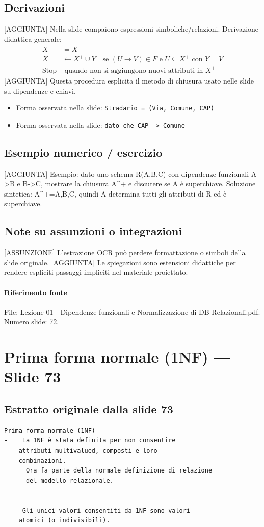 \documentclass[11pt]{article}
\begin{document}
\subsection*{Derivazioni}
[AGGIUNTA] Nella slide compaiono espressioni simboliche/relazioni. Derivazione didattica generale:
\begin{align*}
X^+ &= X \\
X^+ &\leftarrow X^+ \cup Y \quad \text{se } (U \to V) \in F \text{ e } U \subseteq X^+ \text{ con } Y=V \\
\text{Stop} &\text{ quando non si aggiungono nuovi attributi in } X^+
\end{align*}
[AGGIUNTA] Questa procedura esplicita il metodo di chiusura usato nelle slide su dipendenze e chiavi.
\begin{itemize}[leftmargin=*]
\item Forma osservata nella slide: \texttt{Stradario = (Via, Comune, CAP)}
\item Forma osservata nella slide: \texttt{dato che CAP -> Comune}
\end{itemize}
\subsection*{Esempio numerico / esercizio}
[AGGIUNTA] Esempio: dato uno schema R(A,B,C) con dipendenze funzionali A->B e B->C, mostrare la chiusura A^+ e discutere se A è superchiave. Soluzione sintetica: A^+={A,B,C}, quindi A determina tutti gli attributi di R ed è superchiave.
\subsection*{Note su assunzioni o integrazioni}
[ASSUNZIONE] L'estrazione OCR può perdere formattazione o simboli della slide originale.
[AGGIUNTA] Le spiegazioni sono estensioni didattiche per rendere espliciti passaggi impliciti nel materiale proiettato.
\paragraph{Riferimento fonte} File: Lezione 01 - Dipendenze funzionali e Normalizzazione di DB Relazionali.pdf. Numero slide: 72.
\section{Prima forma normale (1NF) --- Slide 73}
\subsection*{Estratto originale dalla slide 73}
\begin{lstlisting}
Prima forma normale (1NF)
-    La 1NF è stata definita per non consentire
    attributi multivalued, composti e loro
    combinazioni.
      Ora fa parte della normale definizione di relazione
      del modello relazionale.


-    Gli unici valori consentiti da 1NF sono valori
    atomici (o indivisibili).
\end{lstlisting}
\end{document}
